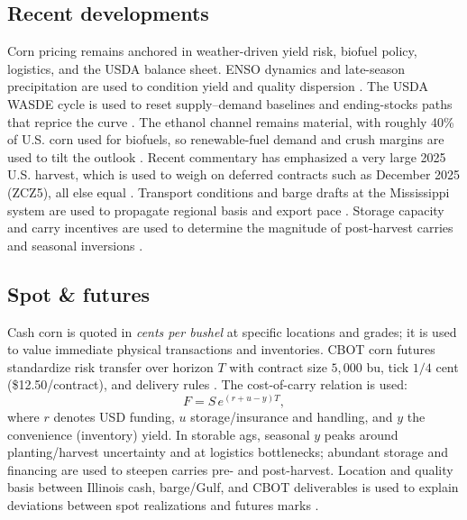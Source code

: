 \documentclass[10pt,a4paper]{article} %
\begin{document}
\subsection{Recent developments}
Corn pricing remains anchored in weather-driven yield risk, biofuel policy, logistics, and the USDA balance sheet. ENSO dynamics and late-season precipitation are used to condition yield and quality dispersion \citep{noaa_enso_discussion}. The USDA WASDE cycle is used to reset supply–demand baselines and ending-stocks paths that reprice the curve \citep{usda_wasde,usda_understanding_wasde}. The ethanol channel remains material, with roughly 40\% of U.S. corn used for biofuels, so renewable-fuel demand and crush margins are used to tilt the outlook \citep{ers_ethanol_40,ers_ethanol_2030}. Recent commentary has emphasized a very large 2025 U.S. harvest, which is used to weigh on deferred contracts such as December 2025 (ZCZ5), all else equal \citep{reuters_record_crop_2025,ers_feedgrains_outlook}. Transport conditions and barge drafts at the Mississippi system are used to propagate regional basis and export pace \citep{ams_gtr_2023}. Storage capacity and carry incentives are used to determine the magnitude of post-harvest carries and seasonal inversions \citep{ncga_storage_2025}.

\subsection{Spot \& futures}
Cash corn is quoted in \emph{cents per bushel} at specific locations and grades; it is used to value immediate physical transactions and inventories. CBOT corn futures standardize risk transfer over horizon \(T\) with contract size \(5{,}000\) bu, tick \(1/4\) cent (\$12.50/contract), and delivery rules \citep{barchart_zc_specs}. The cost-of-carry relation is used:
\[
F=S\,e^{(r+u-y)T},
\]
where \(r\) denotes USD funding, \(u\) storage/insurance and handling, and \(y\) the convenience (inventory) yield. In storable ags, seasonal \(y\) peaks around planting/harvest uncertainty and at logistics bottlenecks; abundant storage and financing are used to steepen carries pre- and post-harvest. Location and quality basis between Illinois cash, barge/Gulf, and CBOT deliverables is used to explain deviations between spot realizations and futures marks \citep{ams_gtr_2023}.
\end{document}
